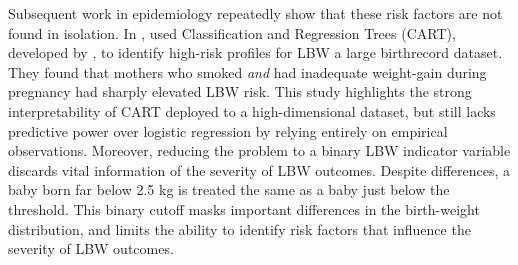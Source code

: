 

Subsequent work in epidemiology repeatedly show that these risk factors are not found in isolation. In \citeyear{KITSANTAS2006275}, \citet{KITSANTAS2006275} used Classification and Regression Trees (CART), developed by \citet{breiman1984classification}, to identify high-risk profiles for LBW a large birthrecord dataset. They found that mothers who smoked \emph{and} had inadequate weight-gain during pregnancy had sharply elevated LBW risk. This study highlights the strong interpretability of CART deployed to a high-dimensional dataset, but still lacks predictive power over logistic regression by relying entirely on empirical observations. Moreover, reducing the problem to a binary LBW indicator variable discards vital information of the severity of LBW outcomes. Despite differences, a baby born far below 2.5 kg is treated the same as a baby just below the threshold. This binary cutoff masks important differences in the birth-weight distribution, and limits the ability to identify risk factors that influence the severity of LBW outcomes.

